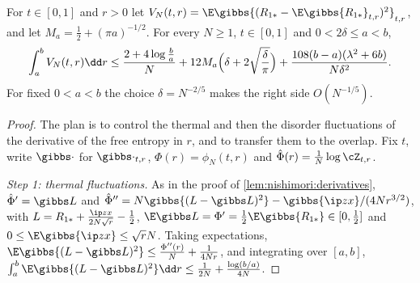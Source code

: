 \begin{refsection}
\begin{proposition}\label{prop:nishimori:overlap}
For $t\in[0,1]$ and $r>0$ let $V_N(t,r)=\E\gibbs{(R_{1*}-\E\gibbs{R_{1*}}_{t,r})^2}_{t,r}$, and let $M_a=\frac12+(\pi a)^{-1/2}$. For every $N\ge1$, $t\in[0,1]$ and $0<2\delta\le a<b$,
\[
\int_a^bV_N(t,r)\dd r\le\frac{2+4\log\frac ba}N+12M_a\Bigl(\delta+2\sqrt{\frac\delta\pi}\Bigr)+\frac{108(b-a)(\lambda^2+6b)}{N\delta^2}.
\]
For fixed $0<a<b$ the choice $\delta=N^{-2/5}$ makes the right side $O(N^{-1/5})$.
\end{proposition}

\begin{proof}
The plan is to control the thermal and then the disorder fluctuations of the derivative of the free entropy in $r$, and to transfer them to the overlap. Fix $t$, write $\gibbs\cdot$ for $\gibbs\cdot_{t,r}$, $\Phi(r)=\phi_N(t,r)$ and $\hat\Phi(r)=\frac1N\log\cZ_{t,r}$.

\emph{Step 1: thermal fluctuations.} As in the proof of \cref{lem:nishimori:derivatives}, $\hat\Phi'=\gibbs L$ and $\hat\Phi''=N\gibbs{(L-\gibbs L)^2}-\gibbs{\ip zx}/(4Nr^{3/2})$, with $L=R_{1*}+\frac{\ip zx}{2N\sqrt r}-\frac12$, $\E\gibbs L=\Phi'=\frac12\E\gibbs{R_{1*}}\in[0,\frac12]$ and $0\le\E\gibbs{\ip zx}\le\sqrt rN$. Taking expectations, $\E\gibbs{(L-\gibbs L)^2}\le\frac{\Phi''(r)}N+\frac1{4Nr}$, and integrating over $[a,b]$, $\int_a^b\E\gibbs{(L-\gibbs L)^2}\dd r\le\frac1{2N}+\frac{\log(b/a)}{4N}$.


\end{proof}
\end{refsection}

